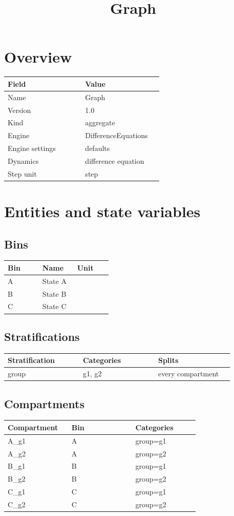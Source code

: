 \documentclass{article}
\title{Graph}
\date{}
\begin{document}
\maketitle
\section*{Overview}
\begin{longtable}{p{0.45\linewidth}p{0.45\linewidth}}
Field & Value \\
\hline
\endhead
Name & Graph \\
Version & 1.0 \\
Kind & aggregate \\
Engine & DifferenceEquations \\
Engine settings & defaults \\
Dynamics & difference equation \\
Step unit & step \\
\end{longtable}
\section*{Entities and state variables}
\subsection*{Bins}
\begin{longtable}{p{0.3\linewidth}p{0.3\linewidth}p{0.3\linewidth}}
Bin & Name & Unit \\
\hline
\endhead
A & State A &  \\
B & State B &  \\
C & State C &  \\
\end{longtable}
\subsection*{Stratifications}
\begin{longtable}{p{0.3\linewidth}p{0.3\linewidth}p{0.3\linewidth}}
Stratification & Categories & Splits \\
\hline
\endhead
group & g1, g2 & every compartment \\
\end{longtable}
\subsection*{Compartments}
\begin{longtable}{p{0.3\linewidth}p{0.3\linewidth}p{0.3\linewidth}}
Compartment & Bin & Categories \\
\hline
\endhead
A\_g1 & A & group=g1 \\
A\_g2 & A & group=g2 \\
B\_g1 & B & group=g1 \\
B\_g2 & B & group=g2 \\
C\_g1 & C & group=g1 \\
C\_g2 & C & group=g2 \\
\end{longtable}
\end{document}
